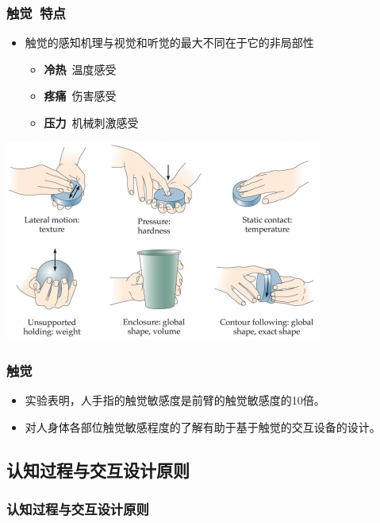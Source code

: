\documentclass{beamer}
\begin{document}
\begin{frame}
	\frametitle{触觉~{\small 特点}}
	\begin{itemize}
		\item 触觉的感知机理与视觉和听觉的最大不同在于它的非局部性
		\begin{itemize}
			\item \textbf{冷热}~温度感受
			\item \textbf{疼痛}~伤害感受
			\item \textbf{压力}~机械刺激感受
		\end{itemize}
	\end{itemize}
	\transdissolve\pause
	\begin{center}
		\includegraphics[scale=.5]{images/tactile-sensitivity.png}
	\end{center}
\end{frame}

\begin{frame}
	\frametitle{触觉}
	\begin{itemize}
		\item 实验表明，人手指的触觉敏感度是前臂的触觉敏感度的10倍。
		\item 对人身体各部位触觉敏感程度的了解有助于基于触觉的交互设备的设计。
	\end{itemize}
\end{frame}

\subsection{认知过程与交互设计原则}
\begin{frame}
	\frametitle{认知过程与交互设计原则}
	\begin{columns}
		\column{6cm}
		\column{4cm}
	\end{columns}
\end{frame}
\end{document}
